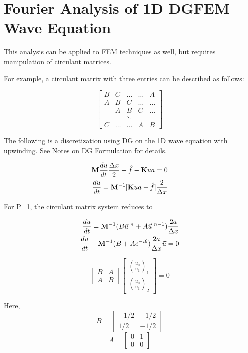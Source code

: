 \documentclass[10pt]{article}
\begin{document}
	
\section{Fourier Analysis of 1D DGFEM Wave Equation}

	This analysis can be applied to FEM techniques as well, but requires manipulation of circulant matrices. 
	
	For example, a circulant matrix with three entries can be described as follows:
	
	\[
	\begin{bmatrix}
		B & C & \hdots & \hdots & A\\
		A & B & C & \hdots& \hdots\\
		& A & B & C & \hdots\\
		& & \ddots\\
		C & \hdots & \hdots& A & B
	\end{bmatrix}
	\]
	
	The following is a discretization using DG on the 1D wave equation with upwinding. See Notes on DG Formulation for details.
	
	\begin{align}
		{\bf{M}} \frac{du}{dt} \frac{\Delta x}{2} + \hat{f} - {\bf{K}}ua = 0 \\
		\frac{du}{dt} = {\bf{M}}^{-1}[{\bf{K}}ua - \hat{f}]\frac{2}{\Delta x}
	\end{align}

	For P=1, the circulant matrix system reduces to 
	
	\begin{align}
		\frac{du}{dt} = {\bf{M}}^{-1} (B\vec{u}\;^n + A\vec{u}\;^{n-1}) \frac{2a}{\Delta x} \\
		\frac{du}{dt} - {\bf{M}}^{-1} (B + Ae^{-i\theta}) \frac{2a}{\Delta x}\vec{u} = 0
	\end{align}

	\[
	\begin{bmatrix}
		B & A\\
		A & B
	\end{bmatrix}
	\begin{bmatrix}
		\binom{u_0}{u_1}_1\\
		\binom{u_0}{u_1}_2
	\end{bmatrix}
	=0
	\]
	
	Here, 
	\[B = 
	\begin{bmatrix}
		-1/2 & -1/2\\
		1/2 & -1/2
	\end{bmatrix}\]
	\[A = 
	\begin{bmatrix}
		0 & 1\\
		0 & 0
	\end{bmatrix}\]
\end{document}
